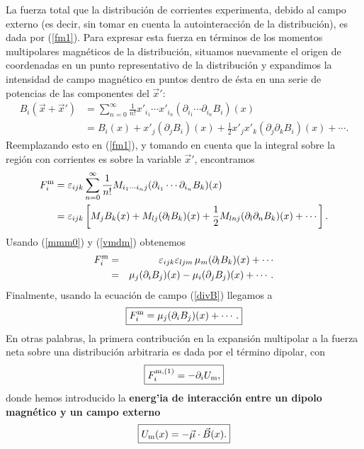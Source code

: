 La fuerza total que la distribución de corrientes experimenta, debido al campo
externo (es decir, sin tomar en cuenta la autointeracción de la distribución),
es dada por (\ref{fm1}). Para expresar esta fuerza en términos de los momentos multipolares magnéticos de la distribución, situamos nuevamente el
origen de coordenadas en un punto representativo de la distribución y expandimos la
intensidad de campo magnético en puntos dentro de ésta en una serie
de potencias de las componentes del $\vec{x}'$:
\begin{align}
 B_i(\vec{x}+\vec{x}') &= \sum_{n=0}^\infty \frac{1}{n!}x'_{i_1}\cdots x'_{i_n}(\partial_{i_1}\cdots\partial_{i_n}B_i)(x) \label{expB} \\
 &= B_i(x)+x'_j(\partial_jB_i)(x) +
\frac{1}{2}x'_jx'_k(\partial_j\partial_kB_i)(x)+\cdots .
\end{align}
Reemplazando esto en (\ref{fm1}), y tomando en cuenta que la integral sobre la región con corrientes es sobre la variable $\vec{x}'$, encontramos
\begin{align}
F^{\rm m}_i &=  \varepsilon_{ijk}\sum_{n=0}^\infty\frac{1}{n!}M_{i_1\cdots i_nj}(\partial_{i_1}\cdots\partial_{i_n}B_k)(x)\\
&= \varepsilon_{ijk}\left[M_jB_k(x)+M_{lj}(\partial_lB_k)(x)+\frac{1}{2}M_{lnj}(\partial_l\partial_nB_k)(x) +\cdots\right].
\end{align}
Usando (\ref{mmm0}) y (\ref{vmdm}) obtenemos
\begin{eqnarray}
F^{\rm m}_i
&=&\varepsilon_{ijk}\varepsilon_{ljm}\,\mu_m (\partial_lB_k)(x)+\cdots \\
&=& \mu_j(\partial_iB_j)(x)-\mu_i(\partial_jB_j)(x)+\cdots .
\end{eqnarray}
Finalmente, usando la ecuación de campo (\ref{divB}) llegamos a
\begin{equation}
 \boxed{F^{\rm m}_i=\mu_j(\partial_iB_j)(x)+\cdots .}
\end{equation}
En otras palabras, la primera contribución en la expansión multipolar a la
fuerza neta sobre una distribución arbitraria es dada por el término dipolar,
con
\begin{equation}
 \boxed{F_i^{\rm m,(1)}=-\partial_i U_{\rm m}, }
\end{equation}
donde hemos introducido la \textbf{energ'ia de interacción entre un dipolo magnético
y un campo externo}
\begin{equation}
 \boxed{U_{\rm m}(x)=-\vec{\mu}\cdot\vec{B}(x).} \label{Umagdip}
\end{equation}

